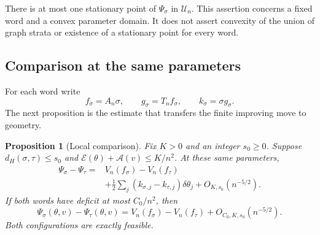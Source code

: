 \documentclass[11pt,reqno]{amsart}
\numberwithin{equation}{section}
\newtheorem{proposition}[theorem]{Proposition}
\theoremstyle{definition}
\theoremstyle{remark}
\newcommand{\A}{\mathcal A}
\newcommand{\E}{\mathcal E}
\newcommand{\dd}{\delta}
\newcommand{\UU}{\mathscr U_n}
\begin{document}
There is at most one stationary point of $\Psi_\sigma$ in $\UU$. This assertion concerns a fixed word and a convex parameter domain. It does not assert convexity of the union of graph strata or existence of a stationary point for every word.

\subsection{Comparison at the same parameters}
For each word write
\[
 f_\sigma=A_n\sigma,\qquad g_\sigma=T_nf_\sigma,\qquad
 k_\sigma=\sigma g_\sigma.
\]
The next proposition is the estimate that transfers the finite improving move to geometry.

\begin{proposition}[Local comparison]\label{prop:relative-fiber}
Fix $K>0$ and an integer $s_0\ge0$. Suppose $d_H(\sigma,\tau)\le s_0$ and
$\E(\theta)+\A(v)\le K/n^2$. At these same parameters,
\begin{equation}\label{eq:relative-coupled}
 \begin{split}
 \Psi_\sigma-\Psi_\tau={}&V_n(f_\sigma)-V_n(f_\tau)\\
 &+\frac12\sum_j(k_{\sigma,j}-k_{\tau,j})\dd\theta_j
   +O_{K,s_0}(n^{-5/2}).
 \end{split}
\end{equation}
If both words have deficit at most $C_0/n^2$, then
\begin{equation}\label{eq:relative-fiber}
 \Psi_\sigma(\theta,v)-\Psi_\tau(\theta,v)
 =V_n(f_\sigma)-V_n(f_\tau)+O_{C_0,K,s_0}(n^{-5/2}).
\end{equation}
Both configurations are exactly feasible.
\end{proposition}
\end{document}
